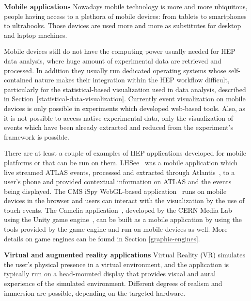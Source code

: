 \documentclass[12pt,a4paper]{article}
\begin{document}

{\bf Mobile applications} Nowadays mobile technology is more and more ubiquitous, people having access to a plethora of mobile devices: from tablets to
smartphones to ultrabooks. Those devices are used more and more as substitutes for desktop and laptop machines.


Mobile devices still do not have the computing power usually needed for HEP data analysis, where huge amount of experimental data
are retrieved and processed. In addition they usually run dedicated operating systems whose self-contained nature
makes their integration within the HEP workflow difficult, particularly for the statistical-based visualization used in
data analysis, described in Section~\ref{statistical-data-visualization}. Currently event visualization on mobile devices is only
possible in experiments which developed web-based tools. Also, as it is not possible to access  native experimental data, only the visualization of events which have been already
extracted and reduced from the experiment's framework is possible.

There are at least a couple of examples of HEP applications developed for mobile platforms or that can be run on them. LHSee~\cite{LHSee}
was a mobile application which live streamed ATLAS events, processed and extracted through Atlantis~\cite{ATLASAtlantis}, to a user’s phone and provided contextual information on ATLAS and the
events being displayed. The CMS iSpy WebGL-based application~\cite{CMSISpyWebGL} runs on mobile devices in the browser and users can interact
with the visualization by the use of touch events. The Camelia application~\cite{CERNCamelia}, %
developed by the
CERN Media Lab using the Unity game engine~\cite{Unity3D}, can be built as a mobile application by using the tools provided by the game engine and run on mobile devices as well. More details on game engines can be found in Section \ref{graphic-engines}.

{\bf Virtual and augmented reality applications} Virtual Reality (VR) simulates the user’s physical presence in a virtual environment, and the application is typically run on a head-mounted display that provides visual and aural experience of the simulated environment. Different degrees of realism and immersion are possible, depending on the targeted hardware.
\end{document}
